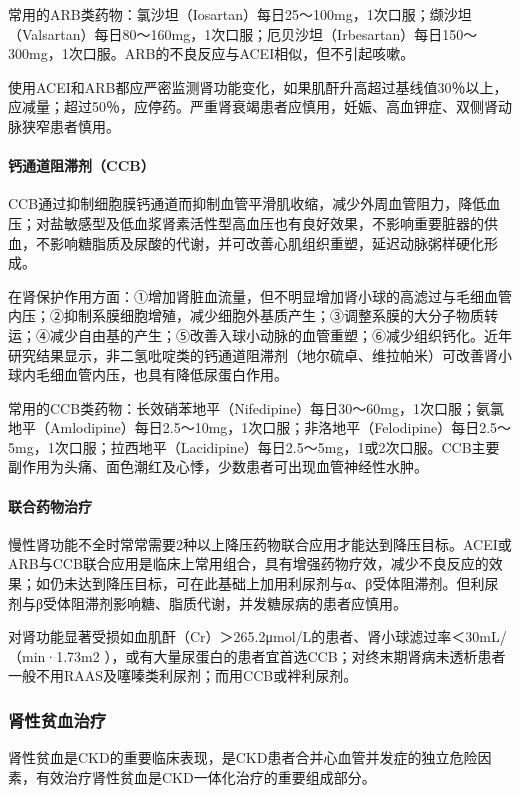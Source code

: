 常用的ARB类药物：氯沙坦（Iosartan）每日25～100mg，1次口服；缬沙坦（Valsartan）每日80～160mg，1次口服；厄贝沙坦（Irbesartan）每日150～300mg，1次口服。ARB的不良反应与ACEI相似，但不引起咳嗽。

使用ACEI和ARB都应严密监测肾功能变化，如果肌酐升高超过基线值30％以上，应减量；超过50％，应停药。严重肾衰竭患者应慎用，妊娠、高血钾症、双侧肾动脉狭窄患者慎用。
\paragraph{钙通道阻滞剂（CCB）}

CCB通过抑制细胞膜钙通道而抑制血管平滑肌收缩，减少外周血管阻力，降低血压；对盐敏感型及低血浆肾素活性型高血压也有良好效果，不影响重要脏器的供血，不影响糖脂质及尿酸的代谢，并可改善心肌组织重塑，延迟动脉粥样硬化形成。

在肾保护作用方面：①增加肾脏血流量，但不明显增加肾小球的高滤过与毛细血管内压；②抑制系膜细胞增殖，减少细胞外基质产生；③调整系膜的大分子物质转运；④减少自由基的产生；⑤改善入球小动脉的血管重塑；⑥减少组织钙化。近年研究结果显示，非二氢吡啶类的钙通道阻滞剂（地尔硫卓、维拉帕米）可改善肾小球内毛细血管内压，也具有降低尿蛋白作用。

常用的CCB类药物：长效硝苯地平（Nifedipine）每日30～60mg，1次口服；氨氯地平（Amlodipine）每日2.5～10mg，1次口服；非洛地平（Felodipine）每日2.5～5mg，1次口服；拉西地平（Lacidipine）每日2.5～5mg，1或2次口服。CCB主要副作用为头痛、面色潮红及心悸，少数患者可出现血管神经性水肿。
\paragraph{联合药物治疗}

慢性肾功能不全时常常需要2种以上降压药物联合应用才能达到降压目标。ACEI或ARB与CCB联合应用是临床上常用组合，具有增强药物疗效，减少不良反应的效果；如仍未达到降压目标，可在此基础上加用利尿剂与α、β受体阻滞剂。但利尿剂与β受体阻滞剂影响糖、脂质代谢，并发糖尿病的患者应慎用。

对肾功能显著受损如血肌酐（Cr）＞265.2μmol/L的患者、肾小球滤过率＜30mL/（min·1.73m{2}
），或有大量尿蛋白的患者宜首选CCB；对终末期肾病未透析患者一般不用RAAS及噻嗪类利尿剂；而用CCB或袢利尿剂。

\subsubsection{肾性贫血治疗}

肾性贫血是CKD的重要临床表现，是CKD患者合并心血管并发症的独立危险因素，有效治疗肾性贫血是CKD一体化治疗的重要组成部分。
